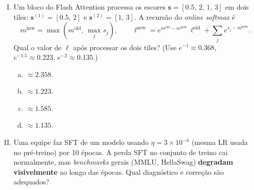 \documentclass{dlproblemset}
\begin{document}
\begin{enumerate}[I)]
\begin{enumerate}[a)]
    \item Com $\mathbf{B} = \mathbf{0}$, temos $\Delta\mathbf{W} = \tfrac{\alpha}{r}\mathbf{B}\mathbf{A} = \mathbf{0}$ no
          passo inicial, logo o modelo adaptado começa \emph{exatamente}
          do pré-treinamento.
    \item Inicializar $\mathbf{B}$ aleatoriamente faria com que o adaptador LoRA
          competisse com os pesos originais, reduzindo o número de
          parâmetros treináveis efetivos.
    \item $\mathbf{B} = \mathbf{0}$ é matematicamente necessário para que a decomposição
          $\Delta\mathbf{W} = \mathbf{B}\mathbf{A}$ tenha \textit{rank} exatamente $r$: inicialização
          aleatória quebraria a restrição de baixo \textit{rank}.
    \item Com $\mathbf{B}$ aleatório, o fator $\alpha/r$ causaria explosão de
          gradiente nas primeiras iterações.
\end{enumerate}

\item Um bloco do Flash Attention processa os escores $\mathbf{s} = [0.5,\,2,\,1,\,3]$
      em dois tiles: $\mathbf{s}^{(1)} = [0.5,\,2]$ e $\mathbf{s}^{(2)} = [1,\,3]$. A recursão do
      \textit{online softmax} é
      \[
        m^{\text{new}} = \max(m^{\text{old}},\,\max_j s_j),
        \qquad
        \ell^{\text{new}} = e^{m^{\text{old}}-m^{\text{new}}}\,\ell^{\text{old}}
          + \textstyle\sum_j e^{s_j - m^{\text{new}}}.
      \]
      Qual o valor de $\ell$ após processar os dois tiles?
      (Use $e^{-1} \approx 0.368$, $e^{-1.5} \approx 0.223$,
      $e^{-2} \approx 0.135$.)

\begin{enumerate}[a)]
    \item $\approx 2.358$.
    \item $\approx 1.223$.
    \item $\approx 1.585$.
    \item $\approx 1.135$.
\end{enumerate}

\item Uma equipe faz SFT de um modelo usando $\eta = 3 \times 10^{-4}$
      (mesma LR usada no pré-treino) por 10 épocas. A perda SFT no conjunto
      de treino cai normalmente, mas \textit{benchmarks} gerais (MMLU,
      HellaSwag) \textbf{degradam visivelmente} ao longo das épocas.
      Qual diagnóstico e correção são adequados?


\end{enumerate}
\end{document}

